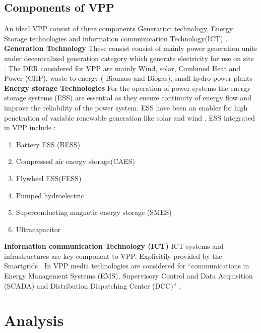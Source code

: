 \documentclass[nonacm,sigconf,12pt]{acmart}
\begin{document}
\subsection*{Components of VPP}
An ideal VPP consist of three components Generation technology, Energy Storage technologies and information communication Technology(ICT) \cite{saboori_2011_virtual}. \newline 
\textbf{Generation Technology} \newline
These consist consist of mainly power generation units under decentralized generation category which generate electricity for use on site \cite{eesienvironmentalandenergystudyinstitute_distributed} . The DER considered for VPP are mainly Wind, solar, Combined Heat and Power (CHP), waste to energy ( Biomass and Biogas), small hydro power plants 
\textbf{Energy storage Technologies} \newline
For the operation of power systems  the energy storage systems (ESS) are essential as they ensure continuity of energy flow and improve  the reliability of the power system. ESS have been an enabler for high penetration of variable renewable generation like solar and wind \cite{jafari_2020_power}. ESS integrated in VPP include :\cite{gharehpetian_2017_distributed} \cite{saboori_2011_virtual}
\begin{enumerate}
    \item Battery ESS (BESS)
    \item Compressed air energy storage(CAES)
    \item Flywheel ESS(FESS)
    \item Pumped hydroelectric
    \item Superconducting magnetic energy storage (SMES)
    \item Ultracapacitor
\end{enumerate}

\textbf{Information communication Technology (ICT)} \newline
ICT systems and  infrastructures are key component to VPP. Explicitily provided by the Smartgrids \cite{potencianomenci_2020_a}. In VPP media technologies are considered for “communications in Energy Management Systems (EMS), Supervisory Control and Data Acquisition (SCADA) \cite{energysystems_scada} and Distribution Dispatching Center (DCC)” \cite{saboori_2011_virtual}, \cite{vilcahuamn_2020_interactive}

\section*{Analysis}
\end{document}

